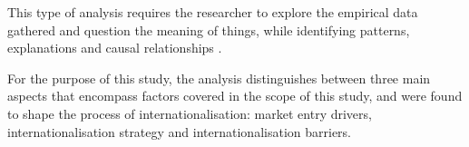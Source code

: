 \documentclass[11pt,a4paper]{article}
\begin{document}
{{ This type of analysis requires the researcher to explore the empirical data gathered and question the meaning of things, while identifying patterns, explanations and causal relationships \parencite{cruzesCaseStudiesSynthesis2015, yinCaseStudyResearch2017}. \par
For the purpose of this study, the analysis distinguishes between three main aspects that encompass factors covered in the scope of this study, and were found to shape the process of internationalisation: market entry drivers, internationalisation strategy and internationalisation barriers. 


\vspace{-2mm}
}}
\end{document}
